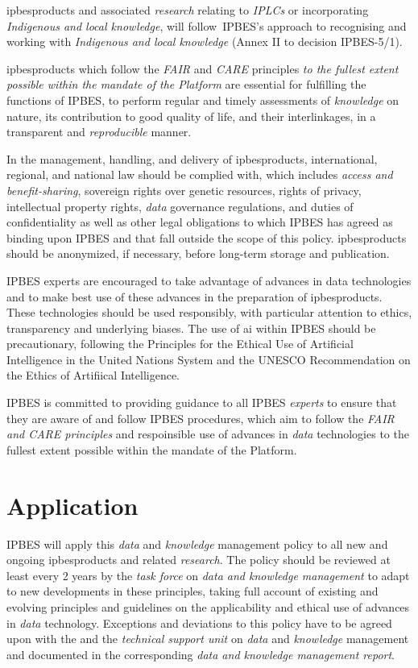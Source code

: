 \documentclass{article}
\begin{document}
\gls{ipbesproducts} and associated \textit{research} relating to \textit{IPLCs} or incorporating \textit{Indigenous and local knowledge}, will follow IPBES’s approach to recognising and working with \textit{Indigenous and local knowledge }(Annex II to decision IPBES-5/1).

\gls{ipbesproducts} which follow the \textit{FAIR }and\textit{ CARE }principles \textit{to the fullest extent possible within the mandate of the Platform} are essential for fulfilling the functions of IPBES, to perform regular and timely assessments of \textit{knowledge} on nature, its contribution to good quality of life, and their interlinkages, in a transparent and \textit{reproducible} manner.

In the management, handling, and delivery of \gls{ipbesproducts}, international, regional, and national law should be complied with, which includes \textit{access and benefit-sharing}, sovereign rights over genetic resources, rights of privacy, intellectual property rights, \textit{data} governance regulations, and duties of confidentiality as well as other legal obligations to which IPBES has agreed as binding upon IPBES and that fall outside the scope of this policy. \gls{ipbesproducts} should be anonymized, if necessary, before long-term storage and publication.

IPBES experts are encouraged to take advantage of advances in \gls{data} technologies and to make best use of these advances in the preparation of \gls{ipbesproducts}. These technologies should be used responsibly, with particular attention to ethics, transparency and underlying biases. The use of \gls{ai} within IPBES should be precautionary, following the Principles for the Ethical Use of Artificial Intelligence in the United Nations System and the UNESCO Recommendation on the Ethics of Artifiical Intelligence.

IPBES is committed to providing guidance to all IPBES \textit{experts} to ensure that they are aware of and follow IPBES procedures, which aim to follow the \textit{FAIR and CARE principles} and respoinsible use of advances in \textit{data} technologies to the fullest extent possible within the mandate of the Platform.

\section{Application}

IPBES will apply this \textit{data} and \textit{knowledge} management policy to all new and ongoing \gls{ipbesproducts} and related \textit{research}. The policy should be reviewed at least every 2 years by the \textit{task force }on \textit{data and knowledge management} to adapt to new developments in these principles, taking full account of existing and evolving principles and guidelines on the applicability and ethical use of advances in \textit{data} technology. Exceptions and deviations to this policy have to be agreed upon with the  and the \textit{technical support unit} on \textit{data} and \textit{knowledge} management and documented in the corresponding \textit{data and knowledge management report}.
\end{document}
